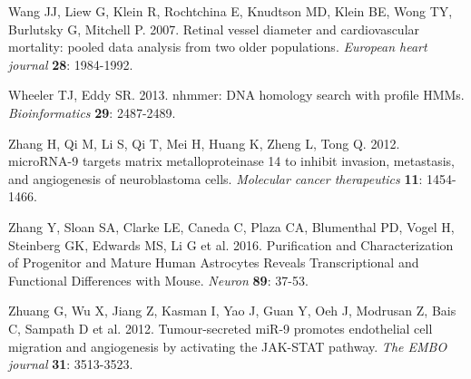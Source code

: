 \documentclass[]{article}
\begin{document}
\protect\hypertarget{_ENREF_34}{}{}Wang JJ, Liew G, Klein R, Rochtchina
E, Knudtson MD, Klein BE, Wong TY, Burlutsky G, Mitchell P. 2007.
Retinal vessel diameter and cardiovascular mortality: pooled data
analysis from two older populations. \emph{European heart journal}
\textbf{28}: 1984-1992.

\protect\hypertarget{_ENREF_35}{}{}Wheeler TJ, Eddy SR. 2013. nhmmer:
DNA homology search with profile HMMs. \emph{Bioinformatics}
\textbf{29}: 2487-2489.

\protect\hypertarget{_ENREF_36}{}{}Zhang H, Qi M, Li S, Qi T, Mei H,
Huang K, Zheng L, Tong Q. 2012. microRNA-9 targets matrix
metalloproteinase 14 to inhibit invasion, metastasis, and angiogenesis
of neuroblastoma cells. \emph{Molecular cancer therapeutics}
\textbf{11}: 1454-1466.

\protect\hypertarget{_ENREF_37}{}{}Zhang Y, Sloan SA, Clarke LE, Caneda
C, Plaza CA, Blumenthal PD, Vogel H, Steinberg GK, Edwards MS, Li G et
al. 2016. Purification and Characterization of Progenitor and Mature
Human Astrocytes Reveals Transcriptional and Functional Differences with
Mouse. \emph{Neuron} \textbf{89}: 37-53.

\protect\hypertarget{_ENREF_38}{}{}Zhuang G, Wu X, Jiang Z, Kasman I,
Yao J, Guan Y, Oeh J, Modrusan Z, Bais C, Sampath D et al. 2012.
Tumour-secreted miR-9 promotes endothelial cell migration and
angiogenesis by activating the JAK-STAT pathway. \emph{The EMBO journal}
\textbf{31}: 3513-3523.
\end{document}
